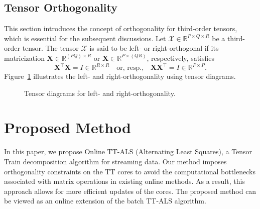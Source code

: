 \documentclass[a4paper, 11pt]{article}
\theoremstyle{plain}
\theoremstyle{definition}
\theoremstyle{remark}
\begin{document}
\subsection{Tensor Orthogonality}
This section introduces the concept of orthogonality for third-order tensors, which is essential for the subsequent discussions.
Let $\mathcal{X} \in \mathbb{R}^{P \times Q \times R}$ be a third-order tensor.
The tensor $\mathcal{X}$ is said to be left- or right-orthogonal if its matricization $\mathbf{X} \in \mathbb{R}^{(P Q) \times R}$ or $\mathbf{X} \in \mathbb{R}^{P \times (Q R)}$, respectively, satisfies
\begin{equation*}
\mathbf{X}^\top \mathbf{X} = I \in \mathbb{R}^{R \times R}
\quad \text{or, resp.,} \quad
\mathbf{X} \mathbf{X}^\top = I \in \mathbb{R}^{P \times P}.
\end{equation*}
Figure~\ref{fig:tensor-diagram-orthogonality} illustrates the left- and right-orthogonality using tensor diagrams.
\begin{figure}[t]
  \centering
\caption{Tensor diagrams for left- and right-orthogonality.}
\label{fig:tensor-diagram-orthogonality}
\end{figure}

\section{Proposed Method}
\label{sec:proposed_method}
In this paper, we propose Online TT-ALS (Alternating Least Squares), a Tensor Train decomposition algorithm for streaming data.
Our method imposes orthogonality constraints on the TT cores to avoid the computational bottlenecks associated with matrix operations in existing online methods.
As a result, this approach allows for more efficient updates of the cores.
The proposed method can be viewed as an online extension of the batch TT-ALS algorithm.
\end{document}
